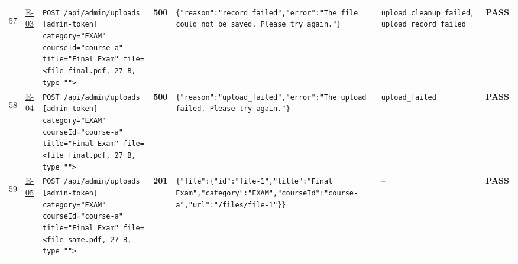 \documentclass[10pt,a4paper]{article}
\begin{document}
\begin{landscape}
\begin{longtable}{@{}P{0.6cm}P{0.9cm}P{8.5cm}P{1.0cm}P{6.2cm}P{4.2cm}P{1.1cm}@{}}
\hypertarget{call57}{57} & \hyperlink{test-E-03}{E-03} & \texttt{POST /\allowbreak{}api/\allowbreak{}admin/\allowbreak{}uploads [admin-\allowbreak{}token] category=\allowbreak{}"\allowbreak{}EXAM"\allowbreak{} courseId=\allowbreak{}"\allowbreak{}course-\allowbreak{}a"\allowbreak{} title=\allowbreak{}"\allowbreak{}Final Exam"\allowbreak{} file=\allowbreak{}<file final.\allowbreak{}pdf,\allowbreak{} 27 B,\allowbreak{} type "\allowbreak{}"\allowbreak{}>} & \textcolor{failred}{\textbf{500}} & \texttt{\{"\allowbreak{}reason"\allowbreak{}:\allowbreak{}"\allowbreak{}record\_\allowbreak{}failed"\allowbreak{},\allowbreak{}"\allowbreak{}error"\allowbreak{}:\allowbreak{}"\allowbreak{}The file could not be saved.\allowbreak{} Please try again.\allowbreak{}"\allowbreak{}\}} & \texttt{upload\_\allowbreak{}cleanup\_\allowbreak{}failed}, \texttt{upload\_\allowbreak{}record\_\allowbreak{}failed} & \textcolor{passgreen}{\textbf{PASS}} \\
\hypertarget{call58}{58} & \hyperlink{test-E-04}{E-04} & \texttt{POST /\allowbreak{}api/\allowbreak{}admin/\allowbreak{}uploads [admin-\allowbreak{}token] category=\allowbreak{}"\allowbreak{}EXAM"\allowbreak{} courseId=\allowbreak{}"\allowbreak{}course-\allowbreak{}a"\allowbreak{} title=\allowbreak{}"\allowbreak{}Final Exam"\allowbreak{} file=\allowbreak{}<file final.\allowbreak{}pdf,\allowbreak{} 27 B,\allowbreak{} type "\allowbreak{}"\allowbreak{}>} & \textcolor{failred}{\textbf{500}} & \texttt{\{"\allowbreak{}reason"\allowbreak{}:\allowbreak{}"\allowbreak{}upload\_\allowbreak{}failed"\allowbreak{},\allowbreak{}"\allowbreak{}error"\allowbreak{}:\allowbreak{}"\allowbreak{}The upload failed.\allowbreak{} Please try again.\allowbreak{}"\allowbreak{}\}} & \texttt{upload\_\allowbreak{}failed} & \textcolor{passgreen}{\textbf{PASS}} \\
\hypertarget{call59}{59} & \hyperlink{test-E-05}{E-05} & \texttt{POST /\allowbreak{}api/\allowbreak{}admin/\allowbreak{}uploads [admin-\allowbreak{}token] category=\allowbreak{}"\allowbreak{}EXAM"\allowbreak{} courseId=\allowbreak{}"\allowbreak{}course-\allowbreak{}a"\allowbreak{} title=\allowbreak{}"\allowbreak{}Final Exam"\allowbreak{} file=\allowbreak{}<file same.\allowbreak{}pdf,\allowbreak{} 27 B,\allowbreak{} type "\allowbreak{}"\allowbreak{}>} & \textcolor{passgreen}{\textbf{201}} & \texttt{\{"\allowbreak{}file"\allowbreak{}:\allowbreak{}\{"\allowbreak{}id"\allowbreak{}:\allowbreak{}"\allowbreak{}file-\allowbreak{}1"\allowbreak{},\allowbreak{}"\allowbreak{}title"\allowbreak{}:\allowbreak{}"\allowbreak{}Final Exam"\allowbreak{},\allowbreak{}"\allowbreak{}category"\allowbreak{}:\allowbreak{}"\allowbreak{}EXAM"\allowbreak{},\allowbreak{}"\allowbreak{}courseId"\allowbreak{}:\allowbreak{}"\allowbreak{}course-\allowbreak{}a"\allowbreak{},\allowbreak{}"\allowbreak{}url"\allowbreak{}:\allowbreak{}"\allowbreak{}/\allowbreak{}files/\allowbreak{}file-\allowbreak{}1"\allowbreak{}\}\}} & -- & \textcolor{passgreen}{\textbf{PASS}} \\

\end{longtable}
\end{landscape}
\end{document}
